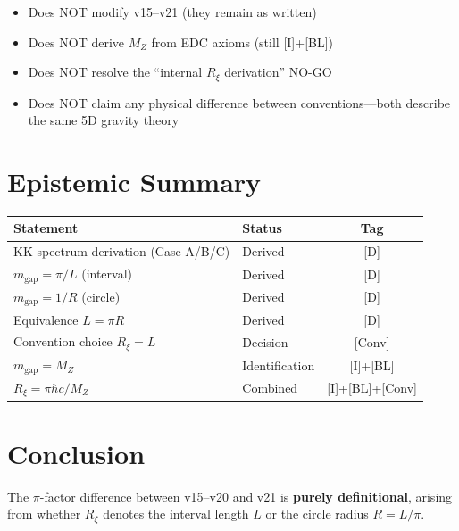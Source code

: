\documentclass[11pt,a4paper]{article}
\newcommand{\Rxi}{R_\xi}
\newcommand{\MZ}{M_Z}
\newcommand{\mgap}{m_{\mathrm{gap}}}
\begin{document}
\begin{itemize}
\item Does NOT modify v15--v21 (they remain as written)
\item Does NOT derive $\MZ$ from EDC axioms (still [I]+[BL])
\item Does NOT resolve the ``internal $\Rxi$ derivation'' NO-GO
\item Does NOT claim any physical difference between conventions---both describe
the same 5D gravity theory
\end{itemize}

\section{Epistemic Summary}

\begin{center}
\begin{tabular}{llc}
\toprule
\textbf{Statement} & \textbf{Status} & \textbf{Tag} \\
\midrule
KK spectrum derivation (Case A/B/C) & Derived & [D] \\
$\mgap = \pi/L$ (interval) & Derived & [D] \\
$\mgap = 1/R$ (circle) & Derived & [D] \\
Equivalence $L = \pi R$ & Derived & [D] \\
Convention choice $\Rxi = L$ & Decision & [Conv] \\
$\mgap = \MZ$ & Identification & [I]+[BL] \\
$\Rxi = \pi\hbar c/\MZ$ & Combined & [I]+[BL]+[Conv] \\
\bottomrule
\end{tabular}
\end{center}

\section{Conclusion}

The $\pi$-factor difference between v15--v20 and v21 is \textbf{purely definitional},
arising from whether $\Rxi$ denotes the interval length $L$ or the circle radius
$R = L/\pi$.
\end{document}
